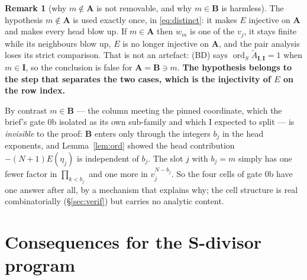 \documentclass[11pt]{article}
\theoremstyle{plain}
\theoremstyle{definition}
\newtheorem{rem}[thm]{Remark}
\newcommand{\At}{\widetilde{A}}
\newcommand{\bA}{\mathbf{A}}
\newcommand{\bB}{\mathbf{B}}
\newcommand{\bI}{\mathbf{I}}
\newcommand{\ord}{\operatorname{ord}}
\begin{document}
\begin{rem}[why $m\notin\bA$ is not removable, and why $m\in\bB$ is harmless]
\label{rem:hyp}
The hypothesis $m\notin\bA$ is used exactly once, in \eqref{eq:distinct}: it makes
$E$ injective on $\bA$ and makes every head blow up.  If $m\in\bA$ then $w_m$ is
one of the $v_j$, it stays finite while its neighbours blow up, $E$ is no longer
injective on $\bA$, and the pair analysis loses its strict comparison.  That is
not an artefact: (BD) says $\ord_S\At_{\bI,\bI}=1$ when $m\in\bI$, so the
conclusion is false for $\bA=\bB\ni m$.  \textbf{The hypothesis belongs to the
step that separates the two cases, which is the injectivity of $E$ on the row
index.}

By contrast $m\in\bB$ --- the column meeting the pinned coordinate, which the
brief's gate 0b isolated as its own sub-family and which I expected to split ---
is \emph{invisible} to the proof: $\bB$ enters only through the integers $b_j$ in
the head exponents, and Lemma~\ref{lem:ord} showed the head contribution
$-(N+1)E(\eta_j)$ is independent of $b_j$.  The slot $j$ with $b_j=m$ simply has
one fewer factor in $\prod_{k<b_j}$ and one more in $v_j^{N-b_j}$.  So the four
cells of gate 0b have one answer after all, by a mechanism that explains why; the
cell structure is real combinatorially (\S\ref{sec:verif}) but carries no
analytic content.
\end{rem}

\section{Consequences for the S-divisor program}
\label{sec:cons}
\end{document}
